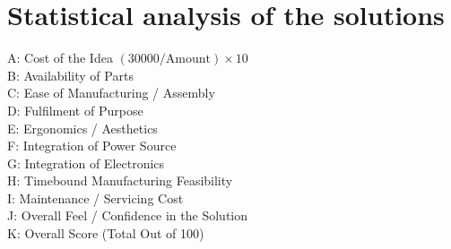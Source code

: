 \documentclass[12pt,oneside,letterpaper,english]{article}
\begin{document}
\section{Statistical analysis of the solutions}
\begin{minipage}{\textwidth}
	\begin{flushleft}
		A: Cost of the Idea \((30000/\text{Amount}) \times 10\) \\[0.1cm]
		B: Availability of Parts\\[0.1cm]
		C: Ease of Manufacturing / Assembly\\[0.1cm]
		D: Fulfilment of Purpose\\[0.1cm]
		E: Ergonomics / Aesthetics\\[0.1cm]
		F: Integration of Power Source\\[0.1cm]
		G: Integration of Electronics\\[0.1cm]
		H: Timebound Manufacturing Feasibility\\[0.1cm]
		I: Maintenance / Servicing Cost\\[0.1cm]
		J: Overall Feel / Confidence in the Solution\\[0.1cm]
		K: Overall Score (Total Out of 100)\\[0.1cm]
	\end{flushleft}
\end{minipage}
\end{document}
